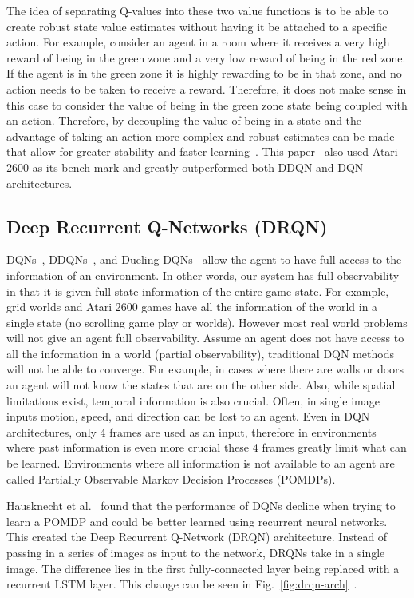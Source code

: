 \documentclass[12pt,american]{report}
\providecommand{\DIFaddbegin}{} %
\providecommand{\DIFaddend}{} %
\newcommand{\DIFaddincludegraphics}[2][]{{\color{blue}\fbox{\DIFOincludegraphics[#1]{#2}}}} %
\DeclareRobustCommand{\DIFaddbegin}{\DIFOaddbegin \let\includegraphics\DIFaddincludegraphics} %
\DeclareRobustCommand{\DIFaddend}{\DIFOaddend \let\includegraphics\DIFOincludegraphics} %
\begin{document}
The idea of separating Q-values into these two value functions is to be able to create robust state value estimates without having it be attached to a specific action.  For example, consider an agent in a room where it receives a very high reward of being in the green zone and a very low reward of being in the red zone. If the agent is in the green zone it is highly rewarding to be in that zone, and no action needs to be taken to receive a reward. Therefore, it does not make sense in this case to consider the value of being in the green zone state being coupled with an action. Therefore, by decoupling the value of being in a state and the advantage of taking an action more complex and robust estimates can be made that allow for greater stability and faster learning~\cite{wang2015dueling}. This paper~\cite{wang2015dueling} also used Atari 2600 as its bench mark and greatly outperformed both DDQN and DQN architectures. 

\subsection{Deep Recurrent Q-Networks (DRQN)}
\DIFaddbegin \label{sec:drqn}
\DIFaddend DQNs~\cite{atari}, DDQNs~\cite{van2016deep}, and Dueling DQNs~\cite{wang2015dueling} allow the agent to have full access to the information of an environment. In other words, our system has full observability in that it is given full state information of the entire game state.  For example, grid worlds and Atari 2600 games have all the information of the world in a single state (no scrolling game play or worlds). However most real world problems will not give an agent full observability. Assume an agent does not have access to all the information in a world (partial observability), traditional DQN methods will not be able to converge. For example, in cases where there are walls or doors an agent will not know the states that are on the other side. Also, while spatial limitations exist, temporal information is also crucial.  Often, in single image inputs motion, speed, and direction can be lost to an agent. Even in DQN architectures, only 4 frames are used as an input, therefore in environments where past information is even more crucial these 4 frames greatly limit what can be learned. Environments where all information is not available to an agent are called Partially Observable Markov Decision Processes (POMDPs).  

Hausknecht et al.~\cite{HausknechtDRQN} found that the performance of DQNs decline when trying to learn a POMDP and could be better learned using recurrent neural networks. This created the Deep Recurrent Q-Network (DRQN) architecture. Instead of passing in a series of images as input to the network, DRQNs take in a single image. The difference lies in the first fully-connected layer being replaced with a recurrent LSTM layer. This change can be seen in Fig.~\ref{fig:drqn-arch}~\cite{HausknechtDRQN}.
\end{document}
